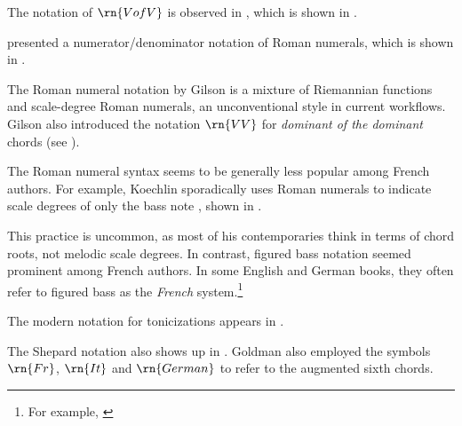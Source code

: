 
The notation of $\rn{V of V}$ is observed in
\textcite{mokrejs1913lessons}, which is shown in
.


\textcite{gilson1919traite} presented a
numerator/denominator notation of Roman numerals, which is
shown in .



The Roman numeral notation by Gilson is a mixture of
Riemannian functions and scale-degree Roman numerals, an
unconventional style in current workflows. Gilson also
introduced the notation $\rn{VV}$ for \emph{dominant of the
dominant} chords (see
).

The Roman numeral syntax seems to be generally less popular
among French authors. For example, Koechlin sporadically
uses Roman numerals to indicate scale degrees of only the
bass note \textcite{koechlin1928traite}, shown in
.


This practice is uncommon, as most of his contemporaries
think in terms of chord roots, not melodic scale degrees. In
contrast, figured bass notation seemed prominent among
French authors. In some English and German books, they often
refer to figured bass as the \emph{French}
system.\footnote{For example,
\textcite{norris1894practical}}

The modern notation for tonicizations appears in
\textcite{tischler1964practical}.

The Shepard notation also shows up in
\textcite{goldman1965harmony}. Goldman also employed the
symbols $\rn{Fr}$, $\rn{It}$ and $\rn{German}$ to refer to
the augmented sixth chords.
